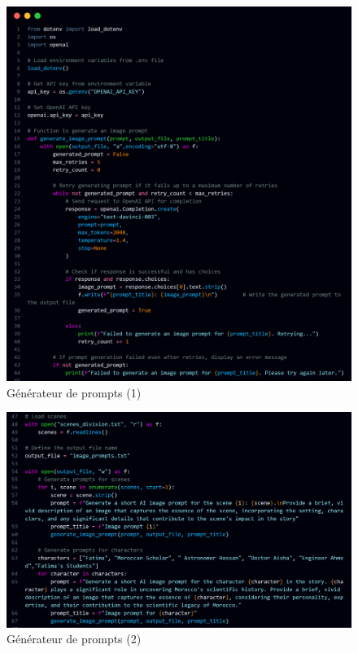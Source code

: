 \documentclass[11,5pt]{report}
\begin{document}
\begin{spacing}{2}
\begin{spacing}{2}
\begin{figure}[htbp]
    \centering
    \includegraphics[keepaspectratio=true,scale=0.4]{images/promptfunction.png}
    \caption{Générateur de prompts (1)}
    \label{fig:p_generator1}
\end{figure}

\begin{figure}[htbp]
    \centering
    \includegraphics[keepaspectratio=true,scale=0.4]{images/image_prompt.png}
    \caption{Générateur de prompts (2)}
    \label{fig:p_generator1}
\end{figure}


\end{spacing}

\end{spacing}
\end{document}
